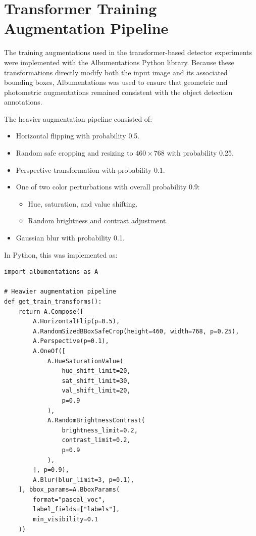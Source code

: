 \section{Transformer Training Augmentation Pipeline}
\label{app:A}

The training augmentations used in the transformer-based detector experiments 
were implemented with the Albumentations Python library. Because these transformations 
directly modify both the input image and its associated bounding boxes, Albumentations
was used to ensure that geometric and photometric augmentations remained consistent 
with the object detection annotations.

The heavier augmentation pipeline consisted of:
\begin{itemize}
    \item Horizontal flipping with probability 0.5.
    \item Random safe cropping and resizing to \(460 \times 768\) with probability 0.25.
    \item Perspective transformation with probability 0.1.
    \item One of two color perturbations with overall probability 0.9:
    \begin{itemize}
        \item Hue, saturation, and value shifting.
        \item Random brightness and contrast adjustment.
    \end{itemize}
    \item Gaussian blur with probability 0.1.
\end{itemize}

In Python, this was implemented as:

\begin{verbatim}
import albumentations as A

# Heavier augmentation pipeline
def get_train_transforms():
    return A.Compose([
        A.HorizontalFlip(p=0.5),
        A.RandomSizedBBoxSafeCrop(height=460, width=768, p=0.25),
        A.Perspective(p=0.1),
        A.OneOf([
            A.HueSaturationValue(
                hue_shift_limit=20,
                sat_shift_limit=30,
                val_shift_limit=20,
                p=0.9
            ),
            A.RandomBrightnessContrast(
                brightness_limit=0.2,
                contrast_limit=0.2,
                p=0.9
            ),
        ], p=0.9),
        A.Blur(blur_limit=3, p=0.1),
    ], bbox_params=A.BboxParams(
        format="pascal_voc",
        label_fields=["labels"],
        min_visibility=0.1
    ))
\end{verbatim}

